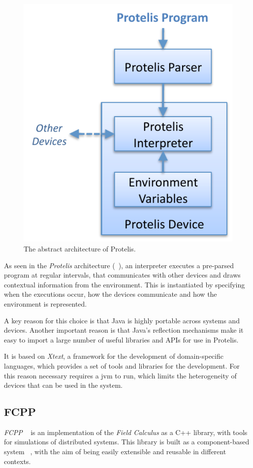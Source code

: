 \begin{figure}
    \centering
    \includegraphics[width=.5\linewidth]{figures/protelis-structure}
    \caption{The abstract architecture of Protelis.}
    \label{fig:protelis-structure}
\end{figure}

As seen in the \emph{Protelis} architecture (~), an interpreter executes a pre-parsed program at regular intervals,
that communicates with other devices and draws contextual information from the environment.
This is instantiated by specifying when the executions occur, how the devices communicate and how the environment is
represented.

A key reason for this choice is that Java is highly portable across systems and devices.
Another important reason is that Java's reflection mechanisms make it easy to import a large number of useful libraries
and APIs for use in Protelis.

It is based on \emph{Xtext}, a framework for the development of domain-specific languages, which provides a set of tools
and libraries for the development.
For this reason necessary requires a \ac{jvm} to run, which limits the heterogeneity of devices
that can be used in the system.

\subsection{FCPP}
\label{subsec:fcpp}
\emph{FCPP} ~\cite{9196401} is an implementation of the \emph{Field Calculus} as a C++ library, with tools for simulations of distributed systems.
This library is built as a component-based system ~, with the aim of being easily extensible and reusable in different contexts.

